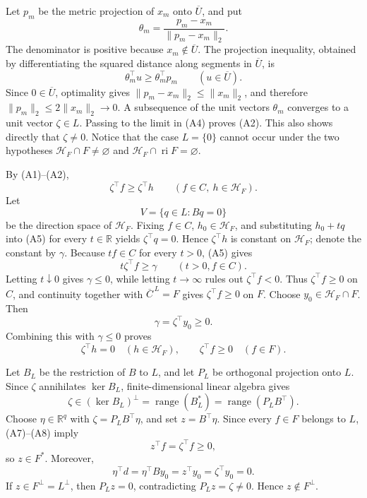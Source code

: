 Let \(p_m\) be the metric projection of \(x_m\) onto \(\overline U\), and put
\[
 \theta_m=\frac{p_m-x_m}{\|p_m-x_m\|_2}.
\]
The denominator is positive because \(x_m\notin\overline U\).  The projection inequality, obtained by differentiating the squared distance along segments in \(\overline U\), is
\[
 \theta_m^{\top}u\geq\theta_m^{\top}p_m
 \qquad(u\in\overline U).                                               \tag{A4}
\]
Since \(0\in\overline U\), optimality gives
\(\|p_m-x_m\|_2\leq\|x_m\|_2\), and therefore
\(\|p_m\|_2\leq2\|x_m\|_2\to0\).  A subsequence of the unit vectors \(\theta_m\) converges to a unit vector \(\zeta\in L\).  Passing to the limit in (A4) proves (A2).  This also shows directly that \(\zeta\ne0\).  Notice that the case \(L=\{0\}\) cannot occur under the two hypotheses \(\mathcal H_F\cap F\ne\varnothing\) and \(\mathcal H_F\cap\operatorname{ri}F=\varnothing\).

By (A1)--(A2),
\[
 \zeta^{\top}f\geq\zeta^{\top}h
 \qquad(f\in C,\ h\in\mathcal H_F).                                    \tag{A5}
\]
Let
\[
 V=\{q\in L:Bq=0\}
\]
be the direction space of \(\mathcal H_F\).  Fixing \(f\in C\), \(h_0\in\mathcal H_F\), and substituting \(h_0+tq\) into (A5) for every \(t\in\mathbb R\) yields \(\zeta^{\top}q=0\).  Hence \(\zeta^{\top}h\) is constant on \(\mathcal H_F\); denote the constant by \(\gamma\).  Because \(tf\in C\) for every \(t>0\), (A5) gives
\[
 t\zeta^{\top}f\geq\gamma\qquad(t>0,f\in C).                          \tag{A6}
\]
Letting \(t\downarrow0\) gives \(\gamma\leq0\), while letting \(t\to\infty\) rules out \(\zeta^{\top}f<0\).  Thus \(\zeta^{\top}f\geq0\) on \(C\), and continuity together with \(\overline C^{\,L}=F\) gives \(\zeta^{\top}f\geq0\) on \(F\).  Choose \(y_0\in\mathcal H_F\cap F\).  Then
\[
 \gamma=\zeta^{\top}y_0\geq0.
\]
Combining this with \(\gamma\leq0\) proves
\[
 \zeta^{\top}h=0\quad(h\in\mathcal H_F),
 \qquad \zeta^{\top}f\geq0\quad(f\in F).                              \tag{A7}
\]

Let \(B_L\) be the restriction of \(B\) to \(L\), and let \(P_L\) be orthogonal projection onto \(L\).  Since \(\zeta\) annihilates \(\ker B_L\), finite-dimensional linear algebra gives
\[
 \zeta\in(\ker B_L)^\perp
       =\operatorname{range}(B_L^*)
       =\operatorname{range}(P_LB^{\top}).                              \tag{A8}
\]
Choose \(\eta\in\mathbb R^q\) with \(\zeta=P_LB^{\top}\eta\), and set \(z=B^{\top}\eta\).  Since every \(f\in F\) belongs to \(L\), (A7)--(A8) imply
\[
 z^{\top}f=\zeta^{\top}f\geq0,
\]
so \(z\in F^*\).  Moreover,
\[
 \eta^{\top}d
 =\eta^{\top}By_0
 =z^{\top}y_0
 =\zeta^{\top}y_0
 =0.                                                                    \tag{A9}
\]
If \(z\in F^\perp=L^\perp\), then \(P_Lz=0\), contradicting \(P_Lz=\zeta\ne0\).  Hence \(z\notin F^\perp\).

